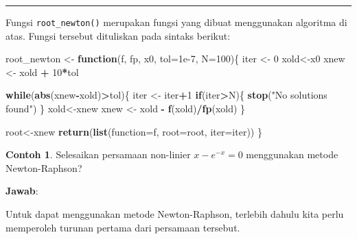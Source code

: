 \documentclass[
]{book}
\newenvironment{Shaded}{\begin{snugshade}}{\end{snugshade}}
\newcommand{\AttributeTok}[1]{\textcolor[rgb]{0.13,0.29,0.53}{#1}}
\newcommand{\ControlFlowTok}[1]{\textcolor[rgb]{0.13,0.29,0.53}{\textbf{#1}}}
\newcommand{\DecValTok}[1]{\textcolor[rgb]{0.00,0.00,0.81}{#1}}
\newcommand{\FloatTok}[1]{\textcolor[rgb]{0.00,0.00,0.81}{#1}}
\newcommand{\FunctionTok}[1]{\textcolor[rgb]{0.13,0.29,0.53}{\textbf{#1}}}
\newcommand{\NormalTok}[1]{#1}
\newcommand{\OtherTok}[1]{\textcolor[rgb]{0.56,0.35,0.01}{#1}}
\newcommand{\SpecialCharTok}[1]{\textcolor[rgb]{0.81,0.36,0.00}{\textbf{#1}}}
\newcommand{\StringTok}[1]{\textcolor[rgb]{0.31,0.60,0.02}{#1}}
\theoremstyle{definition}
\theoremstyle{definition}
\newtheorem{example}{Contoh}[chapter]
\theoremstyle{definition}
\theoremstyle{definition}
\theoremstyle{remark}
\begin{document}
\begin{center}\rule{0.5\linewidth}{0.5pt}\end{center}

Fungsi \texttt{root\_newton()} merupakan fungsi yang dibuat menggunakan algoritma di atas. Fungsi tersebut dituliskan pada sintaks berikut:

\begin{Shaded}
\begin{Highlighting}[]
\NormalTok{root\_newton }\OtherTok{\textless{}{-}} \ControlFlowTok{function}\NormalTok{(f, fp, x0, }\AttributeTok{tol=}\FloatTok{1e{-}7}\NormalTok{, }\AttributeTok{N=}\DecValTok{100}\NormalTok{)\{}
\NormalTok{  iter }\OtherTok{\textless{}{-}} \DecValTok{0}
\NormalTok{  xold}\OtherTok{\textless{}{-}}\NormalTok{x0}
\NormalTok{  xnew }\OtherTok{\textless{}{-}}\NormalTok{ xold }\SpecialCharTok{+} \DecValTok{10}\SpecialCharTok{*}\NormalTok{tol}
  
  \ControlFlowTok{while}\NormalTok{(}\FunctionTok{abs}\NormalTok{(xnew}\SpecialCharTok{{-}}\NormalTok{xold)}\SpecialCharTok{\textgreater{}}\NormalTok{tol)\{}
\NormalTok{    iter }\OtherTok{\textless{}{-}}\NormalTok{ iter}\SpecialCharTok{+}\DecValTok{1}
    \ControlFlowTok{if}\NormalTok{(iter}\SpecialCharTok{\textgreater{}}\NormalTok{N)\{}
      \FunctionTok{stop}\NormalTok{(}\StringTok{"No solutions found"}\NormalTok{)}
\NormalTok{    \}}
\NormalTok{    xold}\OtherTok{\textless{}{-}}\NormalTok{xnew}
\NormalTok{    xnew }\OtherTok{\textless{}{-}}\NormalTok{ xold }\SpecialCharTok{{-}} \FunctionTok{f}\NormalTok{(xold)}\SpecialCharTok{/}\FunctionTok{fp}\NormalTok{(xold)  }
\NormalTok{  \}}
  
\NormalTok{  root}\OtherTok{\textless{}{-}}\NormalTok{xnew}
  \FunctionTok{return}\NormalTok{(}\FunctionTok{list}\NormalTok{(}\StringTok{\textasciigrave{}}\AttributeTok{function}\StringTok{\textasciigrave{}}\OtherTok{=}\NormalTok{f, }\AttributeTok{root=}\NormalTok{root, }\AttributeTok{iter=}\NormalTok{iter))}
\NormalTok{\}}
\end{Highlighting}
\end{Shaded}

\begin{example}
\protect\hypertarget{exm:newtonraphsonexmp}{}\label{exm:newtonraphsonexmp}Selesaikan persamaan non-linier \(x-e^{-x}=0\) menggunakan metode Newton-Raphson?
\end{example}

\textbf{Jawab}:

Untuk dapat menggunakan metode Newton-Raphson, terlebih dahulu kita perlu memperoleh turunan pertama dari persamaan tersebut.
\end{document}
